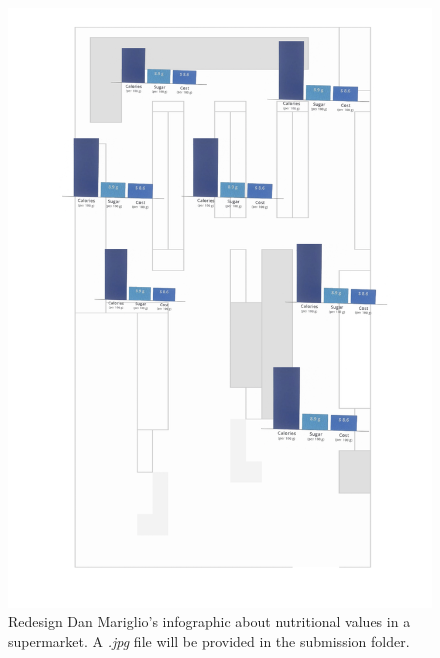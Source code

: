 \documentclass[a4paper, 11pt]{scrartcl}
\begin{document}
\begin{figure}[h]
  \centering
	\includegraphics[scale=0.15]{redesignGraphic.jpg}
  \caption{Redesign Dan Mariglio's infographic about nutritional values in a
	supermarket. A \textit{.jpg} file will be provided in the submission folder.}
	\label{redesignGraphic}
\end{figure}
\end{document}
